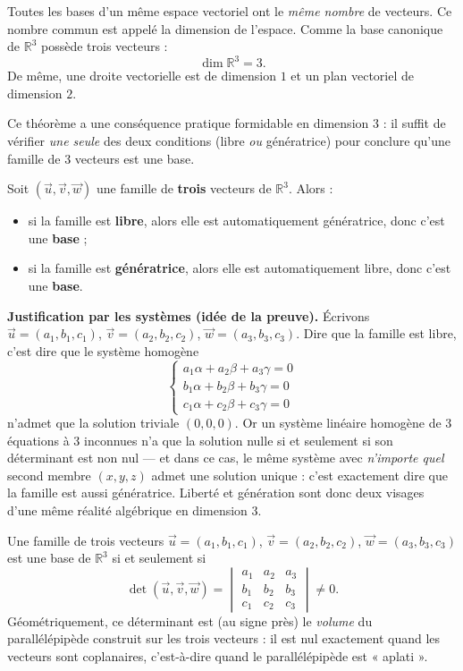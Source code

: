 \documentclass[11pt]{article}
\newcommand{\cle}[1]{{\popxbold\color{popdark}#1}}
\begin{document}
\begin{propriete}
Toutes les bases d'un même espace vectoriel ont le \emph{même nombre} de vecteurs. Ce nombre commun est appelé la \cle{dimension} de l'espace. Comme la base canonique de $\mathbb{R}^3$ possède trois vecteurs :
\[ \dim \mathbb{R}^3 = 3. \]
De même, une droite vectorielle est de dimension $1$ et un plan vectoriel de dimension $2$.
\end{propriete}

Ce théorème a une conséquence pratique formidable en dimension 3 : il suffit de vérifier \emph{une seule} des deux conditions (libre \emph{ou} génératrice) pour conclure qu'une famille de 3 vecteurs est une base.

\begin{propriete}
Soit $(\vec{u}, \vec{v}, \vec{w})$ une famille de \textbf{trois} vecteurs de $\mathbb{R}^3$. Alors :
\begin{itemize}
\item si la famille est \textbf{libre}, alors elle est automatiquement génératrice, donc c'est une \textbf{base} ;
\item si la famille est \textbf{génératrice}, alors elle est automatiquement libre, donc c'est une \textbf{base}.
\end{itemize}
\end{propriete}

\textbf{Justification par les systèmes (idée de la preuve).} Écrivons $\vec{u} = (a_1, b_1, c_1)$, $\vec{v} = (a_2, b_2, c_2)$, $\vec{w} = (a_3, b_3, c_3)$. Dire que la famille est libre, c'est dire que le système homogène
\[ \begin{cases} a_1 \alpha + a_2 \beta + a_3 \gamma = 0 \\ b_1 \alpha + b_2 \beta + b_3 \gamma = 0 \\ c_1 \alpha + c_2 \beta + c_3 \gamma = 0 \end{cases} \]
n'admet que la solution triviale $(0, 0, 0)$. Or un système linéaire homogène de 3 équations à 3 inconnues n'a que la solution nulle si et seulement si son déterminant est non nul — et dans ce cas, le même système avec \emph{n'importe quel} second membre $(x, y, z)$ admet une solution unique : c'est exactement dire que la famille est aussi génératrice. Liberté et génération sont donc deux visages d'une même réalité algébrique en dimension 3.

\begin{propriete}
Une famille de trois vecteurs $\vec{u} = (a_1, b_1, c_1)$, $\vec{v} = (a_2, b_2, c_2)$, $\vec{w} = (a_3, b_3, c_3)$ est une base de $\mathbb{R}^3$ si et seulement si
\[ \det(\vec{u}, \vec{v}, \vec{w}) = \begin{vmatrix} a_1 & a_2 & a_3 \\ b_1 & b_2 & b_3 \\ c_1 & c_2 & c_3 \end{vmatrix} \neq 0. \]
Géométriquement, ce déterminant est (au signe près) le \emph{volume} du parallélépipède construit sur les trois vecteurs : il est nul exactement quand les vecteurs sont coplanaires, c'est-à-dire quand le parallélépipède est « aplati ».
\end{propriete}
\end{document}
